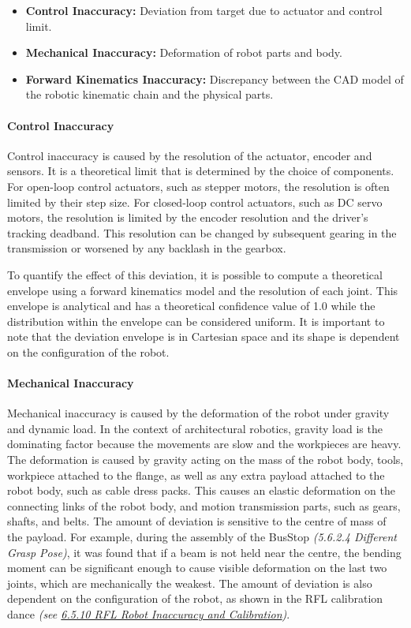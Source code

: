 \documentclass[11pt]{book}
\begin{document}
\begin{itemize}
	\item \textbf{Control Inaccuracy: }Deviation from target due to actuator and control limit.

	\item \textbf{Mechanical Inaccuracy: }Deformation of robot parts and body.

	\item \textbf{Forward Kinematics Inaccuracy: }Discrepancy between the CAD model of the robotic kinematic chain and the physical parts. 

\end{itemize}
\paragraph{Control Inaccuracy}

Control inaccuracy is caused by the resolution of the actuator, encoder and sensors. It is a theoretical limit that is determined by the choice of components. For open-loop control actuators, such as stepper motors, the resolution is often limited by their step size. For closed-loop control actuators, such as DC servo motors, the resolution is limited by the encoder resolution and the driver's tracking deadband. This resolution can be changed by subsequent gearing in the transmission or worsened by any backlash in the gearbox. 

To quantify the effect of this deviation, it is possible to compute a theoretical envelope using a forward kinematics model and the resolution of each joint. This envelope is analytical and has a theoretical confidence value of 1.0 while the distribution within the envelope can be considered uniform. It is important to note that the deviation envelope is in Cartesian space and its shape is dependent on the configuration of the robot.

\paragraph{Mechanical Inaccuracy}

Mechanical inaccuracy is caused by the deformation of the robot under gravity and dynamic load. In the context of architectural robotics, gravity load is the dominating factor because the movements are slow and the workpieces are heavy. The deformation is caused by gravity acting on the mass of the robot body, tools, workpiece attached to the flange, as well as any extra payload attached to the robot body, such as cable dress packs. This causes an elastic deformation on the connecting links of the robot body, and motion transmission parts, such as gears, shafts, and belts. The amount of deviation is sensitive to the centre of mass of the payload. For example, during the assembly of the BusStop\textit{ (5.6.2.4 Different Grasp Pose)}, it was found that if a beam is not held near the centre, the bending moment can be significant enough to cause visible deformation on the last two joints, which are mechanically the weakest. The amount of deviation is also dependent on the configuration of the robot, as shown in the RFL calibration dance\textit{ (see \uline{6.5.10 RFL Robot Inaccuracy and Calibration})}.
\end{document}
